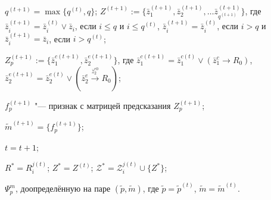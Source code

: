 			\State $q^{(t+1)}=\max\{q^{(t)},q\}$;
			\State $Z^{(t+1)}:=\{\bar z_1^{(t+1)},\bar z_2^{(t+1)},\dots \bar z_{q^{(t+1)}}^{(t+1)}\}$, где $\bar z_i^{(t+1)}=\bar z_i^{(t)}\vee \bar z_i$, если $i\leqslant q$ и $i\leqslant q^{(t)}$, $\bar z_i^{(t+1)}=\bar z_i^{(t)}$, если $i>q$ и $\bar z_i^{(t+1)}=\bar z_i$, если $i > q^{(t)}$;
			
			\State $Z_p^{(t+1)}:=\{\bar z_1^{c(t+1)},\bar z_2^{e(t+1)}\}$, где $\bar z_1^{c(t+1)}=\bar z_1^{c(t)}\vee (\bar z_1^c\rightarrow R_0)$, $\bar z_2^{e(t+1)}=\bar z_2^{e(t)}\vee (\bar z_2^e\xrightarrow{\bar z_2^{e0}} R_0)$;
			
			\State $f_p^{(t+1)}$ "--- признак с матрицей предсказания $Z_p^{(t+1)}$;
			
			\State $\tilde m^{(t+1)}=\{f_p^{(t+1)}\}$;
		\EndIf
	
		\State $t=t+1$;
	\EndWhile

	\State $R^*=R_i^{j(t)}$;
	\State $Z^*=Z^{(t)}$;
	\State $\mathcal Z^{*}=\mathcal Z_i^{j(t)}\cup\{Z^*\}$;	
	
	\Return $\Psi_p^m$, доопределённую на паре $(\tilde p, \tilde m)$, где $\tilde p=\tilde p^{(t)}$, $\tilde m=\tilde m^{(t)}$.
